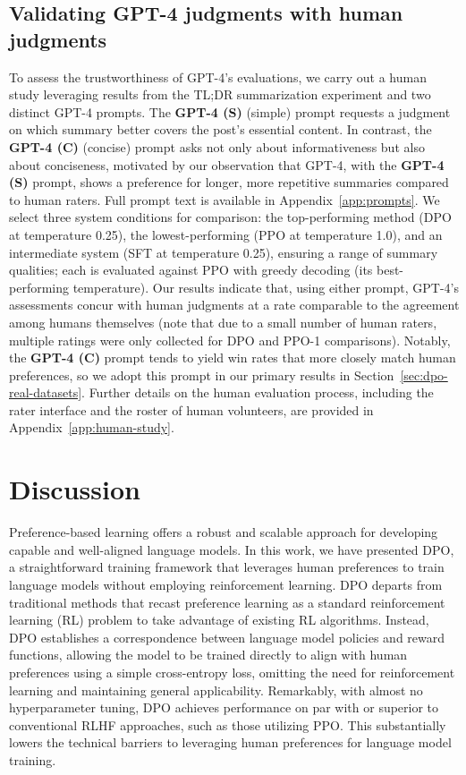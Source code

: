 \subsection{Validating GPT-4 judgments with human judgments}
\label{sec:human-judgments}
To assess the trustworthiness of GPT-4's evaluations, we carry out a human study leveraging results from the TL;DR summarization experiment and two distinct GPT-4 prompts. The \textbf{GPT-4 (S)} (simple) prompt requests a judgment on which summary better covers the post's essential content. In contrast, the \textbf{GPT-4 (C)} (concise) prompt asks not only about informativeness but also about conciseness, motivated by our observation that GPT-4, with the \textbf{GPT-4 (S)} prompt, shows a preference for longer, more repetitive summaries compared to human raters. Full prompt text is available in Appendix~\ref{app:prompts}. We select three system conditions for comparison: the top-performing method (DPO at temperature 0.25), the lowest-performing (PPO at temperature 1.0), and an intermediate system (SFT at temperature 0.25), ensuring a range of summary qualities; each is evaluated against PPO with greedy decoding (its best-performing temperature). Our results indicate that, using either prompt, GPT-4's assessments concur with human judgments at a rate comparable to the agreement among humans themselves (note that due to a small number of human raters, multiple ratings were only collected for DPO and PPO-1 comparisons). Notably, the \textbf{GPT-4 (C)} prompt tends to yield win rates that more closely match human preferences, so we adopt this prompt in our primary results in Section~\ref{sec:dpo-real-datasets}. Further details on the human evaluation process, including the rater interface and the roster of human volunteers, are provided in Appendix~\ref{app:human-study}.

\section{Discussion}
Preference-based learning offers a robust and scalable approach for developing capable and well-aligned language models. In this work, we have presented DPO, a straightforward training framework that leverages human preferences to train language models without employing reinforcement learning. DPO departs from traditional methods that recast preference learning as a standard reinforcement learning (RL) problem to take advantage of existing RL algorithms. Instead, DPO establishes a correspondence between language model policies and reward functions, allowing the model to be trained directly to align with human preferences using a simple cross-entropy loss, omitting the need for reinforcement learning and maintaining general applicability. Remarkably, with almost no hyperparameter tuning, DPO achieves performance on par with or superior to conventional RLHF approaches, such as those utilizing PPO. This substantially lowers the technical barriers to leveraging human preferences for language model training.

